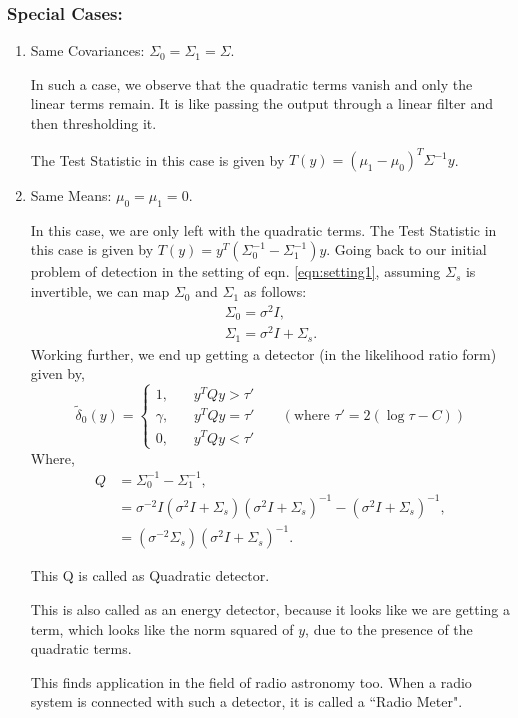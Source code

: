 \documentclass[a4paper,english,12pt]{article}
\begin{document}
\subsubsection*{Special Cases:}
\begin{enumerate}
\item Same Covariances: $\Sigma_0 = \Sigma_1 =\Sigma$.
\par In such a case, we observe that the quadratic terms vanish and only the linear terms remain. It is like passing the output through a linear filter and then thresholding it.
\par The Test Statistic in this case is given by $T(y)=(\mu_1-\mu_0)^T\Sigma^{-1}y$.
\item Same Means: $\mu_0 = \mu_1 = 0$.
\par In this case, we are only left with the quadratic terms. The Test Statistic in this case is given by
$T(y)=y^T(\Sigma_0^{-1}-\Sigma_1^{-1})y$. Going back to our initial problem of detection in the setting of eqn. \eqref{eqn:setting1}, assuming $\Sigma_s$ is invertible, we can map $\Sigma_0$ and $\Sigma_1$ as follows:
\begin{align*}  
\Sigma_0 = \sigma^2I,\\
\Sigma_1 = \sigma^2I + \Sigma_s.
\end{align*}
Working further, we end up getting a detector (in the likelihood ratio form) given by,
\begin{equation*}
\tilde\delta_0(y)=
\begin{cases}
	1, \ \ \ \ \ \ \ \ y^TQy>\tau'\\
	\gamma, \ \ \ \ \ \ \ \ y^TQy=\tau'\\
	0, \ \ \ \ \ \ \ \ y^TQy<\tau'
\end{cases}  \ \ \ \ \ \ \  \left(\mbox{where } \tau'=2(\log\tau-C)\right)
\end{equation*}
Where, 
\begin{align}\label{eqn:Q}
 Q&=\Sigma_0^{-1}-\Sigma_1^{-1},\nonumber\\
 &=\sigma^{-2}I(\sigma^{2}I+\Sigma_s)(\sigma^{2}I+\Sigma_s)^{-1}-(\sigma^{2}I+\Sigma_s)^{-1},\nonumber\\
 &=(\sigma^{-2}\Sigma_s)(\sigma^{2}I+\Sigma_s)^{-1}.
\end{align}  
\begin{rem}
This Q is called as Quadratic detector.
\end{rem}
\begin{rem}
This is also called as an energy detector, because it looks like we are getting a term, which looks like the norm squared of $y$, due to the presence of the quadratic terms.
\end{rem}
\begin{rem}
This finds application in the field of radio astronomy too. When a radio system is connected with such a detector, it is called a ``Radio Meter".
\end{rem}
\end{enumerate}
\end{document}
